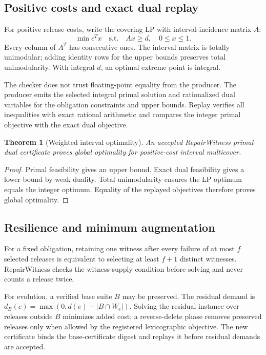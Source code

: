 \documentclass[10pt,conference]{IEEEtran}
\newtheorem{theorem}{Theorem}
\begin{document}
\subsection{Positive costs and exact dual replay}
For positive release costs, write the covering LP with interval-incidence matrix $A$:
\[
\min c^Tx\quad\text{s.t.}\quad Ax\ge d,\quad 0\le x\le1.
\]
Every column of $A^T$ has consecutive ones. The interval matrix is totally unimodular; adding identity rows for the upper bounds preserves total unimodularity. With integral $d$, an optimal extreme point is integral.

The checker does not trust floating-point equality from the producer. The producer emits the selected integral primal solution and rationalized dual variables for the obligation constraints and upper bounds. Replay verifies all inequalities with exact rational arithmetic and compares the integer primal objective with the exact dual objective.

\begin{theorem}[Weighted interval optimality]
An accepted RepairWitness primal--dual certificate proves global optimality for positive-cost interval multicover.
\end{theorem}
\begin{proof}
Primal feasibility gives an upper bound. Exact dual feasibility gives a lower bound by weak duality. Total unimodularity ensures the LP optimum equals the integer optimum. Equality of the replayed objectives therefore proves global optimality.
\end{proof}

\subsection{Resilience and minimum augmentation}
For a fixed obligation, retaining one witness after every failure of at most $f$ selected releases is equivalent to selecting at least $f+1$ distinct witnesses. RepairWitness checks the witness-supply condition before solving and never counts a release twice.

For evolution, a verified base suite $B$ may be preserved. The residual demand is $d_B(e)=\max(0,d(e)-|B\cap W_e|)$. Solving the residual instance over releases outside $B$ minimizes added cost; a reverse-delete phase removes preserved releases only when allowed by the registered lexicographic objective. The new certificate binds the base-certificate digest and replays it before residual demands are accepted.
\end{document}
